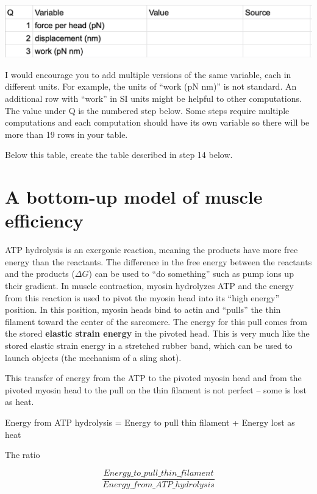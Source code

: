 \documentclass[]{book}
\begin{document}
\includegraphics{images/muscle_computation_table.png}

I would encourage you to add multiple versions of the same variable,
each in different units. For example, the units of ``work (pN nm)'' is
not standard. An additional row with ``work'' in SI units might be
helpful to other computations. The value under Q is the numbered step
below. Some steps require multiple computations and each computation
should have its own variable so there will be more than 19 rows in your
table.

Below this table, create the table described in step 14 below.

\section{A bottom-up model of muscle
efficiency}\label{a-bottom-up-model-of-muscle-efficiency}

ATP hydrolysis is an exergonic reaction, meaning the products have more
free energy than the reactants. The difference in the free energy
between the reactants and the products (\(\Delta G\)) can be used to
``do something'' such as pump ions up their gradient. In muscle
contraction, myosin hydrolyzes ATP and the energy from this reaction is
used to pivot the myosin head into its ``high energy'' position. In this
position, myosin heads bind to actin and ``pulls'' the thin filament
toward the center of the sarcomere. The energy for this pull comes from
the stored \textbf{elastic strain energy} in the pivoted head. This is
very much like the stored elastic strain energy in a stretched rubber
band, which can be used to launch objects (the mechanism of a sling
shot).

This transfer of energy from the ATP to the pivoted myosin head and from
the pivoted myosin head to the pull on the thin filament is not perfect
-- some is lost as heat.

Energy from ATP hydrolysis = Energy to pull thin filament + Energy lost
as heat

The ratio

\begin{equation}
\frac{Energy\_to\_pull\_thin\_filament}{Energy\_from\_ATP\_hydrolysis}
\label{eq:efficiency}
\end{equation}
\end{document}
